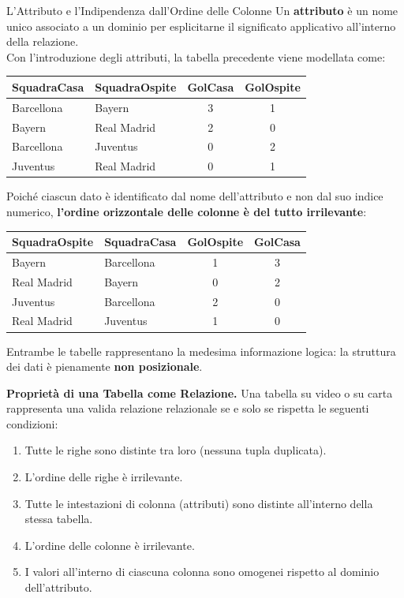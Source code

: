 \documentclass[12pt]{extarticle}
\begin{document}
\begin{cbox}{L'Attributo e l'Indipendenza dall'Ordine delle Colonne}
\noindent Un \textbf{attributo} è un nome unico associato a un dominio per esplicitarne il significato applicativo all'interno della relazione. \\
Con l'introduzione degli attributi, la tabella precedente viene modellata come:
\begin{center}
\small
\begin{tabular}{llcc}
    \toprule
    \textbf{SquadraCasa} & \textbf{SquadraOspite} & \textbf{GolCasa} & \textbf{GolOspite} \\
    \midrule
    Barcellona & Bayern & 3 & 1 \\
    Bayern & Real Madrid & 2 & 0 \\
    Barcellona & Juventus & 0 & 2 \\
    Juventus & Real Madrid & 0 & 1 \\
    \bottomrule
\end{tabular}
\end{center}
\medskip
\noindent Poiché ciascun dato è identificato dal nome dell'attributo e non dal suo indice numerico, \textbf{l'ordine orizzontale delle colonne è del tutto irrilevante}:
\begin{center}
\small
\begin{tabular}{llcc}
    \toprule
    \textbf{SquadraOspite} & \textbf{SquadraCasa} & \textbf{GolOspite} & \textbf{GolCasa} \\
    \midrule
    Bayern & Barcellona & 1 & 3 \\
    Real Madrid & Bayern & 0 & 2 \\
    Juventus & Barcellona & 2 & 0 \\
    Real Madrid & Juventus & 1 & 0 \\
    \bottomrule
\end{tabular}
\end{center}
Entrambe le tabelle rappresentano la medesima informazione logica: la struttura dei dati è pienamente \textbf{non posizionale}.
\end{cbox}

\medskip
\noindent \textbf{Proprietà di una Tabella come Relazione.} Una tabella su video o su carta rappresenta una valida relazione relazionale se e solo se rispetta le seguenti condizioni:
\begin{enumerate}
    \item Tutte le righe sono distinte tra loro (nessuna tupla duplicata).
    \item L'ordine delle righe è irrilevante.
    \item Tutte le intestazioni di colonna (attributi) sono distinte all'interno della stessa tabella.
    \item L'ordine delle colonne è irrilevante.
    \item I valori all'interno di ciascuna colonna sono omogenei rispetto al dominio dell'attributo.
\end{enumerate}
\end{document}
